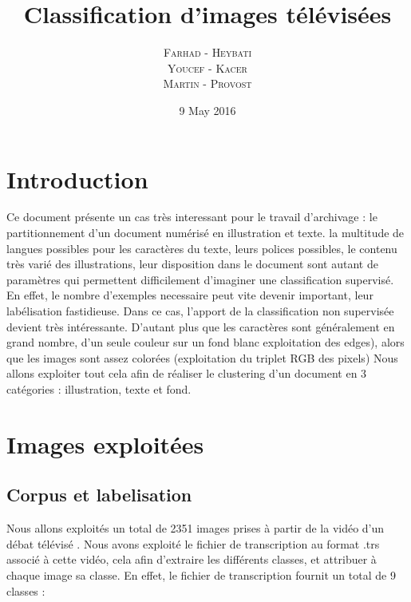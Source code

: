 \documentclass{book}
\title{Classification d'images télévisées}
\author{\textsc{Farhad} - \textsc{Heybati}\\
\textsc{Youcef} - \textsc{Kacer}\\
\textsc{Martin} - \textsc{Provost}}
\date{9 May 2016}
\begin{document}
 
\maketitle

\tableofcontents

\frontmatter
\chapter{Introduction}
Ce document présente un cas très interessant pour le travail d'archivage : le partitionnement d'un document numérisé en illustration et texte.
la multitude de langues possibles pour les caractères du texte, leurs polices possibles, le contenu très varié des illustrations, leur disposition dans le document sont autant de paramètres
qui permettent difficilement d'imaginer une classification supervisé. En effet, le nombre d'exemples necessaire peut vite devenir important, leur labélisation fastidieuse.
Dans ce cas, l'apport de la classification non supervisée devient très intéressante. D'autant plus que les caractères sont généralement en grand nombre, d'un seule couleur sur un fond blanc
exploitation des edges), alors que les images sont assez colorées (exploitation du triplet RGB des pixels)
Nous allons exploiter tout cela afin de réaliser le clustering d'un document en 3 catégories : illustration, texte et fond.


\mainmatter
\chapter{Images exploitées}
\section{Corpus et labelisation}\label{labelisation}
Nous allons exploités un total de 2351 images prises à partir de la vidéo d'un débat télévisé \cite{ref} .
Nous avons exploité le fichier de transcription au format .trs \cite{ref} associé à cette vidéo, cela afin d'extraire les différents classes, et attribuer à chaque image sa classe.
En effet, le fichier de transcription fournit un total de 9 classes : \\
\end{document}
